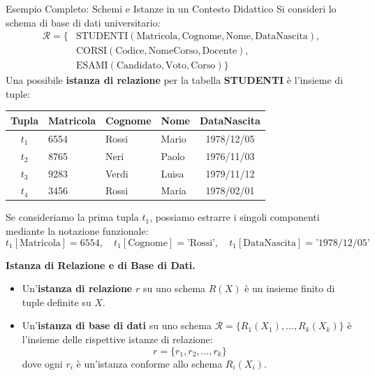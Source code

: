 \documentclass[12pt]{extarticle}
\begin{document}
\begin{cbox}{Esempio Completo: Schemi e Istanze in un Contesto Didattico}
\noindent Si consideri lo schema di base di dati universitario:
\begin{align*}
\mathcal{R} = \{ & \text{STUDENTI}(\text{Matricola}, \text{Cognome}, \text{Nome}, \text{DataNascita}), \\
                 & \text{CORSI}(\text{Codice}, \text{NomeCorso}, \text{Docente}), \\
                 & \text{ESAMI}(\text{Candidato}, \text{Voto}, \text{Corso}) \}
\end{align*}
\noindent Una possibile \textbf{istanza di relazione} per la tabella \textbf{STUDENTI} è l'insieme di tuple:
\begin{center}
\small
\begin{tabular}{clllc}
    \toprule
    \textbf{Tupla} & \textbf{Matricola} & \textbf{Cognome} & \textbf{Nome} & \textbf{DataNascita} \\
    \midrule
    $t_1$ & 6554 & Rossi & Mario & 1978/12/05 \\
    $t_2$ & 8765 & Neri & Paolo & 1976/11/03 \\
    $t_3$ & 9283 & Verdi & Luisa & 1979/11/12 \\
    $t_4$ & 3456 & Rossi & Maria & 1978/02/01 \\
    \bottomrule
\end{tabular}
\end{center}
\medskip
\noindent Se consideriamo la prima tupla $t_1$, possiamo estrarre i singoli componenti mediante la notazione funzionale:
$$t_1[\text{Matricola}] = 6554, \quad t_1[\text{Cognome}] = \text{'Rossi'}, \quad t_1[\text{DataNascita}] = \text{'1978/12/05'}$$
\end{cbox}

\medskip
\noindent \textbf{Istanza di Relazione e di Base di Dati.}
\begin{itemize}
    \item Un'\textbf{istanza di relazione} $r$ su uno schema $R(X)$ è un insieme finito di tuple definite su $X$.
    \item Un'\textbf{istanza di base di dati} su uno schema $\mathcal{R} = \{R_1(X_1), \dots, R_k(X_k)\}$ è l'insieme delle rispettive istanze di relazione:
    $$r = \{ r_1, r_2, \dots, r_k \}$$
    dove ogni $r_i$ è un'istanza conforme allo schema $R_i(X_i)$.
\end{itemize}
\end{document}
